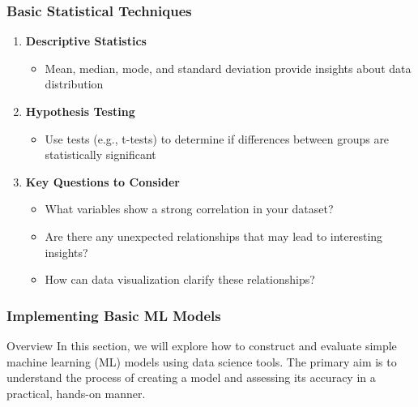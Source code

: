 \documentclass[aspectratio=169]{beamer}
\begin{document}
\begin{frame}[fragile]
    \frametitle{Basic Statistical Techniques}
    \begin{enumerate}
        \item \textbf{Descriptive Statistics}
            \begin{itemize}
                \item Mean, median, mode, and standard deviation provide insights about data distribution
            \end{itemize}
        
        \item \textbf{Hypothesis Testing}
            \begin{itemize}
                \item Use tests (e.g., t-tests) to determine if differences between groups are statistically significant
            \end{itemize}
        
        \item \textbf{Key Questions to Consider}
            \begin{itemize}
                \item What variables show a strong correlation in your dataset?
                \item Are there any unexpected relationships that may lead to interesting insights?
                \item How can data visualization clarify these relationships?
            \end{itemize}
    \end{enumerate}
\end{frame}

\begin{frame}[fragile]
    \frametitle{Implementing Basic ML Models}
    \begin{block}{Overview}
        In this section, we will explore how to construct and evaluate simple machine learning (ML) models using data science tools. The primary aim is to understand the process of creating a model and assessing its accuracy in a practical, hands-on manner.
    \end{block}
\end{frame}
\end{document}

